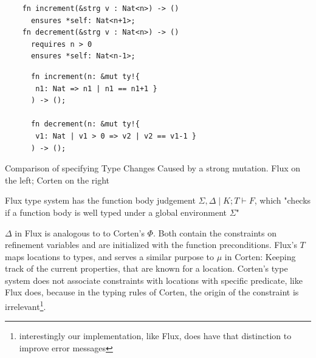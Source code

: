\documentclass[twoside, english]{sdqthesis}
\theoremstyle{definition}
\begin{document}
\begin{listing}[ht]
  \begin{minipage}[t]{0.48\linewidth}
    
    \begin{verbatim}
    fn increment(&strg v : Nat<n>) -> ()
      ensures *self: Nat<n+1>;
    fn decrement(&strg v : Nat<n>) -> ()
      requires n > 0
      ensures *self: Nat<n-1>;
    \end{verbatim}
  \end{minipage}
  \begin{minipage}[t]{0.48\linewidth}
    \begin{verbatim}
      fn increment(n: &mut ty!{
       n1: Nat => n1 | n1 == n1+1 }
      ) -> ();

      fn decrement(n: &mut ty!{ 
       v1: Nat | v1 > 0 => v2 | v2 == v1-1 }
      ) -> ();
    \end{verbatim}
  \end{minipage}
  
  \caption{Comparison of specifying Type Changes Caused by a strong mutation. Flux on the left; Corten on the right}
  \label{lst:compare-flux-strong-updates}
\end{listing}

Flux type system has the function body judgement $\Sigma, \Delta \mid K;T \vdash F$, which "checks if a function body is well typed under a global environment $\Sigma$" \cite[p. 11]{lehmann_flux_2022}

$\Delta$ in Flux is analogous to to Corten's $\Phi$. Both contain the constraints on refinement variables and are initialized with the function preconditions. 
Flux's $T$ maps locations to types, and serves a similar purpose to $\mu$ in Corten: Keeping track of the current properties, that are known for a location. Corten's type system does not associate constraints with locations with specific predicate, like Flux does, because in the typing rules of Corten, the origin of the constraint is irrelevant\footnote{interestingly our implementation, like Flux, does have that distinction to improve error messages}.
\end{document}
